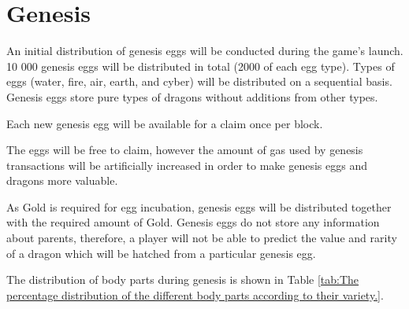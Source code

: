 \documentclass[12pt]{article}
\begin{document}

\newpage
\par

\section{Genesis}
 \label{Genesis}  \par

An initial distribution of genesis eggs will be conducted during the game’s launch. 10 000 genesis eggs will be distributed in total (2000 of each egg type). Types of eggs (water, fire, air, earth, and cyber) will be distributed on a sequential basis. Genesis eggs store pure types of dragons without additions from other types.\par

Each new genesis egg will be available for a claim once per block.\par

The eggs will be free to claim, however the amount of gas used by genesis transactions will be artificially increased in order to make genesis eggs and dragons more valuable.\par

As Gold is required for egg incubation, genesis eggs will be distributed together with the required amount of Gold. Genesis eggs do not store any information about parents, therefore, a player will not be able to predict the value and rarity of a dragon which will be hatched from a particular genesis egg.\par

The distribution of body parts during genesis is shown in  Table \ref{tab:The percentage distribution of the different body parts according to their variety.}.\par




\end{document}
